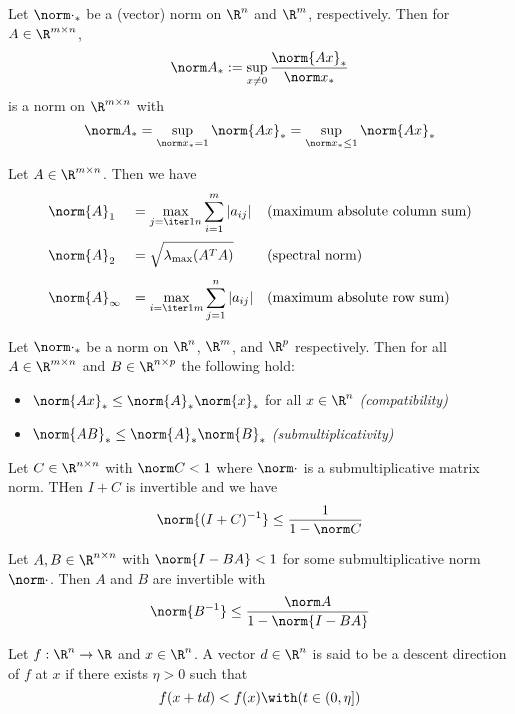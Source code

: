 \label{bad47a4}

Let $\norm\cdot_*$ be a (vector) norm on $\R^n$ and $\R^m$,
respectively. Then for $A\in\R^{m\times n}$,
$$
	\norm A_*:=\sup_{x\neq0}\frac{\norm{Ax}_*}{\norm x_*}
$$
is a norm on $\R^{m\times n}$ with
$$
	\norm A_*=\sup_{\norm x_*=1}\norm{Ax}_*=\sup_{\norm x_*\leq1}\norm{Ax}_*
$$

\label{ab2107f}

Let $A\in\R^{m\times n}$. Then we have
$$
	\begin{array}{l l l}
		\norm{A}_1      & = \displaystyle\max_{j=\iter1n}\sum_{i=1}^m|a_{ij}| & \text{(maximum absolute column sum)} \\[1.5em]
		\norm{A}_2      & = \displaystyle\sqrt{\lambda_{\max}(A^TA)}          & \text{(spectral norm)}               \\[1em]
		\norm{A}_\infty & = \displaystyle\max_{i=\iter1m}\sum_{j=1}^n|a_{ij}| & \text{(maximum absolute row sum)}
	\end{array}
$$

\label{dd47a09}

Let $\norm\cdot_*$ be a norm on $\R^n$, $\R^m$, and $\R^p$
respectively. Then for all $A\in\R^{m\times n}$ and $B\in\R^{n\times
		p}$ the following hold:
\begin{itemize}
	\def\nm#1{\norm{#1}_*}
	\item $\nm{Ax}\leq\nm A\nm x$ for all $x\in\R^n$ \quad \textit{(compatibility)}
	\item $\nm{AB}\leq\nm A\nm B$ \quad \textit{(submultiplicativity)}
\end{itemize}

\label{c733e75}

Let $C\in\R^{n\times n}$ with $\norm C<1$ where $\norm\cdot$ is a
submultiplicative matrix norm. THen $I+C$ is invertible and we have
$$
	\norm{(I+C)^{-1}}\leq\frac1{1-\norm C}
$$

\label{ae04fae}

Let $A,B\in\R^{n\times n}$ with $\norm{I-BA}<1$ for some
submultiplicative norm $\norm\cdot$. Then $A$ and $B$ are invertible
with
$$
	\norm{B^{-1}}\leq\frac{\norm A}{1-\norm{I-BA}}
$$

\label{ac99a6d}

Let $f:\R^n\to\R$ and $x\in\R^n$. A vector $d\in\R^n$ is said to be a
descent direction of $f$ at $x$ if there exists $\eta>0$ such that
$$
	f(x+td)<f(x)\with(t\in(0,\eta])
$$

